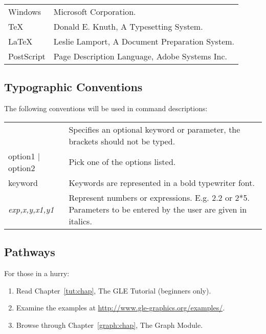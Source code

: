 \begin{tabular}{ll} %
{Windows}	& Microsoft Corporation.\\
{\TeX}		& Donald E. Knuth, A Typesetting System.\\
{\LaTeX}	& Leslie Lamport, A Document Preparation System.\\
{PostScript}	& Page Description Language, Adobe Systems Inc.\\
\end{tabular}

\subsection*{Typographic Conventions} 

The following conventions will be used in command descriptions:

\begin{tabular}{lp{10cm}}
{\sf [option]} &  Specifies an optional keyword or parameter, the brackets
	should not be typed.\\
{\sf option1 $\mid$ option2} &
	Pick one of the options listed.\\
 {\sf keyword} &
	Keywords are represented in a bold typewriter font.\\
{\it exp,x,y,x1,y1} &
  	Represent numbers or expressions.  E.g. 2.2 or 2*5.
	Parameters to be entered by the user are given in italics.
\end{tabular}

\subsection*{Pathways}

For those in a hurry:
\begin{enumerate}
 \item		Read Chapter~\ref{tut:chap}, The GLE Tutorial (beginners only).
 \item		Examine the examples at \url{http://www.gle-graphics.org/examples/}.
 \item		Browse through Chapter~\ref{graph:chap}, The Graph Module.
\end{enumerate}
	
